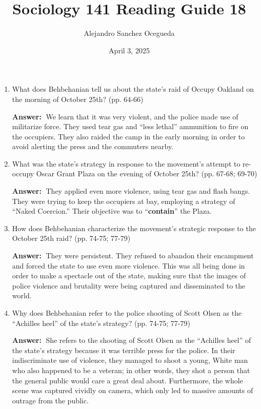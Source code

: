\documentclass{article}
\title{Sociology 141 Reading Guide 18}
\author{Alejandro Sanchez Ocegueda}
\date{April 3, 2025}
\newcommand{\answer}{\textbf{Answer:}$\;$}
\begin{document}
\maketitle

\begin{enumerate}[label=\arabic*)]
    \item What does Behbehanian tell us about the state's raid of Occupy Oakland on the morning of October 25th? (pp. 64-66)
    
    \answer 
    We learn that it was very violent, and the police made use of militarize force.
    They used tear gas and ``less lethal'' ammunition to fire on the occupiers.
    They also raided the camp in the early morning in order to avoid alerting the press and the commuters nearby.
    
    \item What was the state's strategy in response to the movement's attempt to re-occupy Oscar Grant Plaza on the evening of October 25th? (pp. 67-68; 69-70)
    
    \answer 
    They applied even more violence, using tear gas and flash bangs.
    They were trying to keep the occupiers at bay, employing a strategy of ``Naked Coercion.''
    Their objective was to ``\textbf{contain}'' the Plaza.
    
    \item How does Behbehanian characterize the movement's strategic response to the October 25th raid? (pp. 74-75; 77-79)
   
    \answer
    They were persistent. 
    They refused to abandon their encampment and forced the state to use even more violence.
    This was all being done in order to make a spectacle out of the state, making sure that the images of police violence and brutality were being captured and disseminated to the world.
    
    \item Why does Behbehanian refer to the police shooting of Scott Olsen as the ``Achilles heel'' of the state's strategy? (pp. 74-75; 77-79)
    
    \answer 
    She refers to the shooting of Scott Olsen as the ``Achilles heel'' of the state's strategy because it was terrible press for the police.
    In their indiscriminate use of violence, they managed to shoot a young, White man who also happened to be a veteran; 
    in other words, they shot a person that the general public would care a great deal about.
    Furthermore, the whole scene was captured vividly on camera, which only led to massive amounts of outrage from the public.
    

\end{enumerate}
\end{document}
